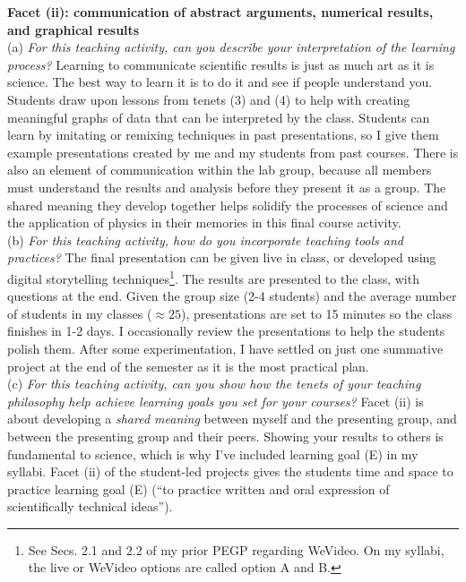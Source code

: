 \documentclass[../../../main.tex]{subfiles}
\begin{document}
\vspace{0.15cm}
\textbf{Facet (ii): communication of abstract arguments, numerical results, and graphical results}
\\
\vspace{0.15cm}
(a) \textit{For this teaching activity, can you describe your interpretation of the learning process?}  Learning to communicate scientific results is just as much art as it is science.  The best way to learn it is to do it and see if people understand you.  Students draw upon lessons from tenets (3) and (4) to help with creating meaningful graphs of data that can be interpreted by the class.  Students can learn by imitating or remixing techniques in past presentations, so I give them example presentations created by me and my students from past courses.  There is also an element of communication within the lab group, because all members must understand the results and analysis before they present it as a group.  The shared meaning they develop together helps solidify the processes of science and the application of physics in their memories in this final course activity.
\\
\vspace{0.15cm}
(b) \textit{For this teaching activity, how do you incorporate teaching tools and practices?}  The final presentation can be given live in class, or developed using digital storytelling techniques\footnote{See Secs. 2.1 and 2.2 of my prior PEGP regarding WeVideo.  On my syllabi, the live or WeVideo options are called option A and B.}.  The results are presented to the class, with questions at the end.  Given the group size (2-4 students) and the average number of students in my classes ($\approx 25$), presentations are set to 15 minutes so the class finishes in 1-2 days.  I occasionally review the presentations to help the students polish them.  After some experimentation, I have settled on just one summative project at the end of the semester as it is the most practical plan.
\\
\vspace{0.15cm}
(c) \textit{For this teaching activity, can you show how the tenets of your teaching philosophy help achieve learning goals you set for your courses?}  Facet (ii) is about developing a \textit{shared meaning} between myself and the presenting group, and between the presenting group and their peers.  Showing your results to others is fundamental to science, which is why I've included learning goal (E) in my syllabi.  Facet (ii) of the student-led projects gives the students time and space to practice learning goal (E) (``to practice written and oral expression of scientifically technical ideas'').
\end{document}
